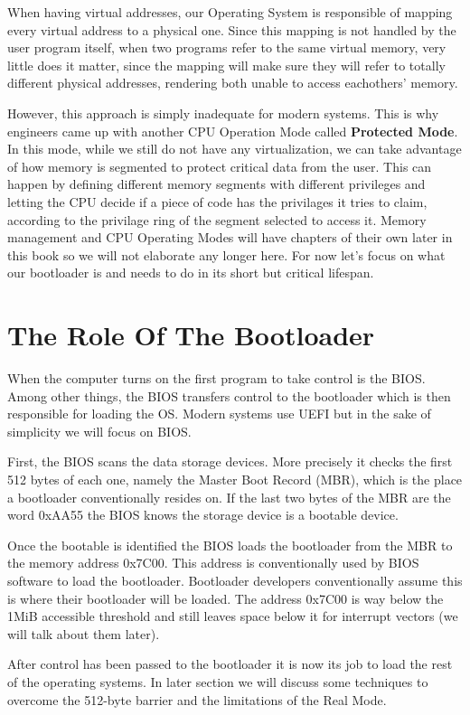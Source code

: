 When having virtual addresses, our Operating System is responsible of mapping every virtual address to a physical one. Since this 
mapping is not handled by the user program itself, when two programs refer to the same virtual memory, very little does it matter,
since the mapping will make sure they will refer to totally different physical addresses, rendering both unable to access eachothers'
memory.

However, this approach is simply inadequate for modern systems. This is why engineers came up with another CPU Operation Mode called
\textbf{Protected Mode}. In this mode, while we still do not have any virtualization, we can take advantage of how memory is segmented
to protect critical data from the user. This can happen by defining different memory segments with different privileges
and letting the CPU decide if a piece of code has the privilages it tries to claim, according to the privilage ring of the 
segment selected to access it. Memory management and CPU Operating Modes will have chapters of their own later in this book so
we will not elaborate any longer here. For now let's focus on what our bootloader is and needs to do in its short but critical lifespan. 

\section{The Role Of The Bootloader}

When the computer turns on the first program to take control is the BIOS. Among other things, the BIOS transfers control to the bootloader
which is then responsible for loading the OS. Modern systems use UEFI but in the sake of simplicity we will focus on BIOS.

First, the BIOS scans the data storage devices. More precisely it checks the first 512 bytes of each one, namely the Master Boot Record 
(MBR), which is the place a bootloader conventionally resides on. If the last two bytes of the MBR are the word 0xAA55 the BIOS 
knows the storage device is a bootable device.

Once the bootable is identified the BIOS loads the bootloader from the MBR to the memory address 0x7C00. This address is conventionally
used by BIOS software to load the bootloader. Bootloader developers conventionally assume this is where their bootloader will 
be loaded. The address 0x7C00 is way below the 1MiB accessible threshold and still leaves space below it for interrupt vectors (we will
talk about them later).

After control has been passed to the bootloader it is now its job to load the rest of the operating systems. In later section we will 
discuss some techniques to overcome the 512-byte barrier and the limitations of the Real Mode. 
